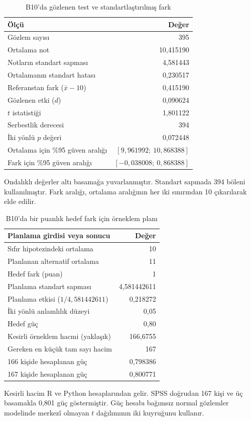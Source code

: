 \begin{table}[H]
\centering
\caption{B10'da gözlenen test ve standartlaştırılmış fark}
\label{tab:b10-dogrulanmis-gozlenen}
\begin{tabular}{@{}lr@{}}
\toprule
Ölçü & Değer \\
\midrule
Gözlem sayısı & 395 \\
Ortalama not & 10,415190 \\
Notların standart sapması & 4,581443 \\
Ortalamanın standart hatası & 0,230517 \\
Referanstan fark ($\bar x-10$) & 0,415190 \\
Gözlenen etki ($d$) & 0,090624 \\
$t$ istatistiği & 1,801122 \\
Serbestlik derecesi & 394 \\
İki yönlü $p$ değeri & 0,072448 \\
Ortalama için \%95 güven aralığı & $[9{,}961992;\ 10{,}868388]$ \\
Fark için \%95 güven aralığı & $[-0{,}038008;\ 0{,}868388]$ \\
\bottomrule
\end{tabular}
\par\smallskip
{\footnotesize Ondalıklı değerler altı basamağa yuvarlanmıştır.
Standart sapmada 394 böleni kullanılmıştır. Fark aralığı, ortalama
aralığının her iki sınırından 10 çıkarılarak elde edilir.\par}
\end{table}

\begin{table}[H]
\centering
\caption{B10'da bir puanlık hedef fark için örneklem planı}
\label{tab:b10-dogrulanmis-plan}
\begin{tabular}{@{}lr@{}}
\toprule
Planlama girdisi veya sonucu & Değer \\
\midrule
Sıfır hipotezindeki ortalama & 10 \\
Planlanan alternatif ortalama & 11 \\
Hedef fark (puan) & 1 \\
Planlama standart sapması & 4,581442611 \\
Planlama etkisi ($1/4{,}581442611$) & 0,218272 \\
İki yönlü anlamlılık düzeyi & 0,05 \\
Hedef güç & 0,80 \\
Kesirli örneklem hacmi (yaklaşık) & 166,6755 \\
Gereken en küçük tam sayı hacim & 167 \\
166 kişide hesaplanan güç & 0,798386 \\
167 kişide hesaplanan güç & 0,800771 \\
\bottomrule
\end{tabular}
\par\smallskip
{\footnotesize Kesirli hacim R ve Python hesaplarından gelir.
SPSS doğrudan 167 kişi ve üç basamakla 0,801 güç göstermiştir.
Güç hesabı bağımsız normal gözlemler modelinde merkezî olmayan
$t$ dağılımının iki kuyruğunu kullanır.\par}
\end{table}

